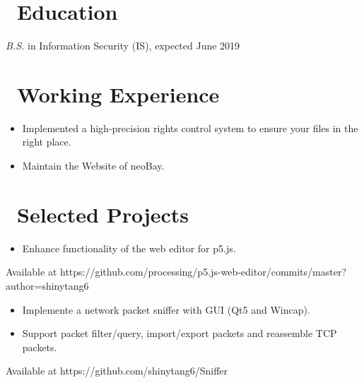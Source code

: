 \documentclass{resume}
\begin{document}



\section{\faGraduationCap\ Education}
\textit{B.S.} in Information Security (IS), expected June 2019

\section{\faBuilding\ Working Experience}

\begin{itemize}
  \item Implemented a high-precision rights control system to ensure your files in the right place.
  \item Maintain the Website of neoBay.
\end{itemize}

\section{\faUsers\ Selected Projects}

\begin{itemize}
  \item Enhance functionality of the web editor for p5.js.
\end{itemize}
Available at https://github.com/processing/p5.js-web-editor/commits/master?author=shinytang6


\begin{itemize}
  \item Implemente a network packet sniffer with GUI (Qt5 and Wincap).
  \item Support packet filter/query, import/export packets and reassemble TCP packets.
\end{itemize}
Available at https://github.com/shinytang6/Sniffer
\end{document}
